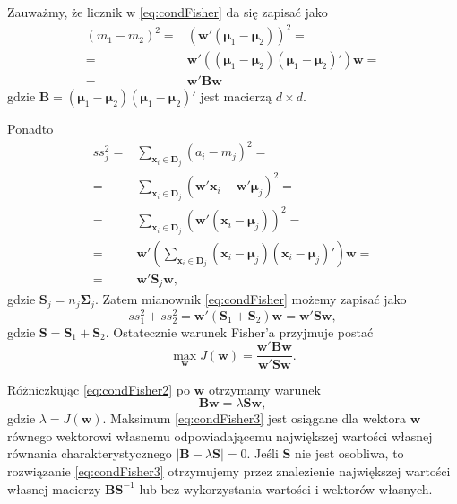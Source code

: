 \documentclass[]{book}
\theoremstyle{plain}
\theoremstyle{definition}
\theoremstyle{definition}
\theoremstyle{definition}
\theoremstyle{definition}
\theoremstyle{remark}
\begin{document}
Zauważmy, że licznik w \eqref{eq:condFisher} da się zapisać jako
\begin{align}
    (m_1-m_2)^2=& ( \boldsymbol w'( \boldsymbol \mu_1- \boldsymbol \mu_2))^2=\\
    =& \boldsymbol w'((\boldsymbol \mu_1- \boldsymbol \mu_2)(\boldsymbol \mu_1- \boldsymbol \mu_2)') \boldsymbol w=\\
    =& \boldsymbol w' \boldsymbol B \boldsymbol w
\end{align}
gdzie \(\boldsymbol B=(\boldsymbol \mu_1- \boldsymbol \mu_2)(\boldsymbol \mu_1- \boldsymbol \mu_2)'\) jest macierzą \(d\times d\).

Ponadto
\begin{align}
    ss_j^2=&\sum_{ \boldsymbol x_i\in \boldsymbol D_j}(a_i-m_j)^2=\\
    =&\sum_{ \boldsymbol x_i\in \boldsymbol D_j}( \boldsymbol w' \boldsymbol x_i- \boldsymbol w' \boldsymbol\mu_j)^2=\\
    =& \sum_{ \boldsymbol x_i\in \boldsymbol D_j}( \boldsymbol{w}'( \boldsymbol{x}_i- \boldsymbol{\mu}_j))^2=\\
    =& \boldsymbol{w}'\left(\sum_{ \boldsymbol x_i\in \boldsymbol D_j}(\boldsymbol{x}_i-\boldsymbol \mu_j)(\boldsymbol x_i- \boldsymbol \mu_j)'\right) \boldsymbol{w}=\\
    =& \boldsymbol{w}' \boldsymbol{S}_j \boldsymbol{w},
    \label{eq:Sj}
\end{align}
gdzie \(\boldsymbol{S}_j=n_j \boldsymbol{\Sigma}_j\).
Zatem mianownik \eqref{eq:condFisher} możemy zapisać jako
\begin{equation}
    ss_1^2+ss_2^2= \boldsymbol{w}'(\boldsymbol{S}_1+ \boldsymbol{S}_2) \boldsymbol{w}= \boldsymbol{w}' \boldsymbol{S} \boldsymbol{w},
\end{equation}
gdzie \(\boldsymbol{S}=\boldsymbol{S}_1+\boldsymbol{S}_2\).
Ostatecznie warunek Fisher'a przyjmuje postać
\begin{equation}
    \max_{ \boldsymbol{w}}J( \boldsymbol{w})=\frac{ \boldsymbol{w}' \boldsymbol{B} \boldsymbol{w}}{ \boldsymbol{w}' \boldsymbol{S} \boldsymbol{w}}.
    \label{eq:condFisher2}
\end{equation}

Różniczkując \eqref{eq:condFisher2} po \(\boldsymbol{w}\) otrzymamy warunek
\begin{equation}
    \boldsymbol{B} \boldsymbol{w} = \lambda \boldsymbol{S} \boldsymbol{w},
    \label{eq:condFisher3}
\end{equation}
gdzie \(\lambda=J(\boldsymbol{w})\). Maksimum \eqref{eq:condFisher3} jest osiągane dla wektora \(\boldsymbol{w}\) równego wektorowi własnemu odpowiadającemu największej wartości własnej równania charakterystycznego \(|\boldsymbol{B}-\lambda\boldsymbol{S}|=0\). Jeśli \(\boldsymbol{S}\) nie jest osobliwa, to rozwiązanie \eqref{eq:condFisher3} otrzymujemy przez znalezienie największej wartości własnej macierzy \(\boldsymbol{B}\boldsymbol{S}^{-1}\) lub bez wykorzystania wartości i wektorów własnych.
\end{document}
